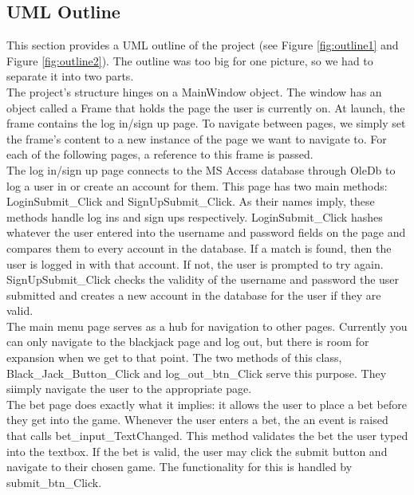 \documentclass[10pt,conference,onecolumn,compsoc]{IEEEtran}
\begin{document}
\subsection{UML Outline}
\noindent
This section provides a UML outline of the project (see Figure \ref{fig:outline1} and Figure \ref{fig:outline2}). The outline was too big for one picture, so we had to separate it into two parts.\\
\newline
The project's structure hinges on a MainWindow object. The window has an object called a Frame that holds the page the user is currently on. At launch, the frame contains the log in/sign up page. To navigate between pages, we simply set the frame's content to a new instance of the page we want to navigate to. For each of the following pages, a reference to this frame is passed.\\
\newline
The log in/sign up page connects to the MS Access database through OleDb to log a user in or create an account for them. This page has two main methods: LoginSubmit\_Click and SignUpSubmit\_Click. As their names imply, these methods handle log ins and sign ups respectively.  LoginSubmit\_Click hashes whatever the user entered into the username and password fields on the page and compares them to every account in the database. If a match is found, then the user is logged in with that account. If not, the user is prompted to try again. SignUpSubmit\_Click
checks the validity of the username and password the user submitted and creates a new account in the database for the user if they are valid.\\
\newline
The main menu page serves as a hub for navigation to other pages. Currently you can only navigate to the blackjack page and log out, but there is room for expansion when we get to that point. The two methods of this class, Black\_Jack\_Button\_Click and log\_out\_btn\_Click serve this purpose. They siimply navigate the user to the appropriate page.\\
\newline
The bet page does exactly what it implies: it allows the user to place a bet before they get into the game. Whenever the user enters a bet, the an event is raised that calls bet\_input\_TextChanged. This method validates the bet the user typed into the textbox. If the bet is valid, the user may click the submit button and navigate to their chosen game. The functionality for this is handled by submit\_btn\_Click.\\
\end{document}

